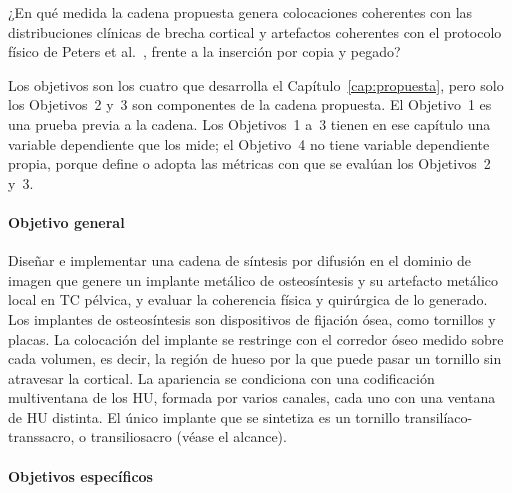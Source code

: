 
¿En qué medida la cadena propuesta genera colocaciones coherentes con las distribuciones clínicas de brecha cortical y artefactos coherentes con el protocolo físico de Peters et al.~\cite{peters2025hybrid}, frente a la inserción por copia y pegado?


Los objetivos son los cuatro que desarrolla el Capítulo~\ref{cap:propuesta}, pero solo los Objetivos~2 y~3 son componentes de la cadena propuesta. El Objetivo~1 es una prueba previa a la cadena. Los Objetivos~1 a~3 tienen en ese capítulo una variable dependiente que los mide; el Objetivo~4 no tiene variable dependiente propia, porque define o adopta las métricas con que se evalúan los Objetivos~2 y~3.

\paragraph{Objetivo general}

Diseñar e implementar una cadena de síntesis por difusión en el dominio de imagen que genere un implante metálico de osteosíntesis y su artefacto metálico local en TC pélvica, y evaluar la coherencia física y quirúrgica de lo generado. Los implantes de osteosíntesis son dispositivos de fijación ósea, como tornillos y placas. La colocación del implante se restringe con el corredor óseo medido sobre cada volumen, es decir, la región de hueso por la que puede pasar un tornillo sin atravesar la cortical. La apariencia se condiciona con una codificación multiventana de los HU, formada por varios canales, cada uno con una ventana de HU distinta. El único implante que se sintetiza es un tornillo transilíaco-transsacro, o transiliosacro (véase el alcance).

\paragraph{Objetivos específicos}

